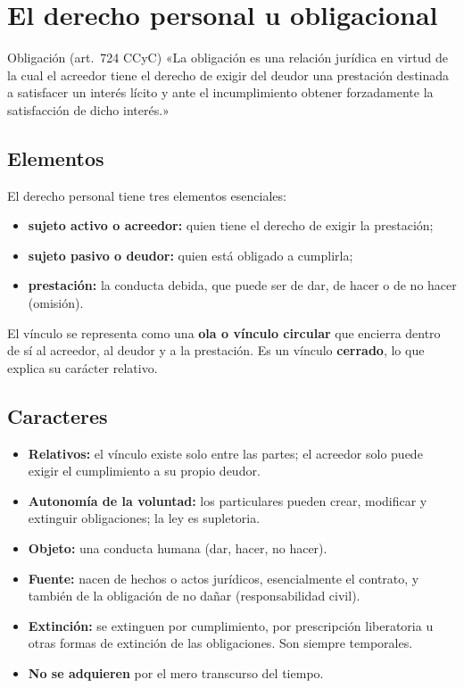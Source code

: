 \documentclass[12pt,oneside]{book}
\begin{document}
\section{El derecho personal u obligacional}

\begin{definicion}{Obligación (art.~724 CCyC)}
«La obligación es una relación jurídica en virtud de la cual el acreedor tiene el derecho de exigir del deudor una prestación destinada a satisfacer un interés lícito y ante el incumplimiento obtener forzadamente la satisfacción de dicho interés.»
\end{definicion}

\subsection{Elementos}

El derecho personal tiene tres elementos esenciales:

\begin{itemize}
    \item \textbf{sujeto activo o acreedor:} quien tiene el derecho de exigir la prestación;
    \item \textbf{sujeto pasivo o deudor:} quien está obligado a cumplirla;
    \item \textbf{prestación:} la conducta debida, que puede ser de dar, de hacer o de no hacer (omisión).
\end{itemize}

El vínculo se representa como una \textbf{ola o vínculo circular} que encierra dentro de sí al acreedor, al deudor y a la prestación. Es un vínculo \textbf{cerrado}, lo que explica su carácter relativo.

\subsection{Caracteres}

\begin{itemize}
    \item \textbf{Relativos:} el vínculo existe solo entre las partes; el acreedor solo puede exigir el cumplimiento a su propio deudor.
    \item \textbf{Autonomía de la voluntad:} los particulares pueden crear, modificar y extinguir obligaciones; la ley es supletoria.
    \item \textbf{Objeto:} una conducta humana (dar, hacer, no hacer).
    \item \textbf{Fuente:} nacen de hechos o actos jurídicos, esencialmente el contrato, y también de la obligación de no dañar (responsabilidad civil).
    \item \textbf{Extinción:} se extinguen por cumplimiento, por prescripción liberatoria u otras formas de extinción de las obligaciones. Son siempre temporales.
    \item \textbf{No se adquieren} por el mero transcurso del tiempo.
\end{itemize}
\end{document}
